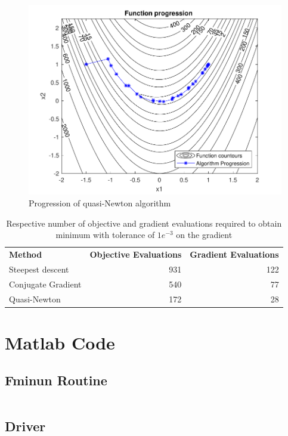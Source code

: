 \documentclass{article}
\newcommand{\wide}{0.7\linewidth}
\begin{document}
\begin{figure}[H]
	\centering
	\includegraphics[width=\wide]{progression3.pdf}
	\caption{Progression of quasi-Newton algorithm}
	\label{fig:steepest3}
\end{figure}

\begin{table}[H]
	\centering
	\caption{Respective number of objective and gradient evaluations required to obtain minimum with tolerance of $1e^{-3}$ on the gradient}
	\label{my-label}
	\begin{tabular}{|l|r|r|}
		\hline
		\textbf{Method}    & \textbf{Objective Evaluations} & \textbf{Gradient Evaluations} \\
		Steepest descent   &                            931 &                           122 \\
		Conjugate Gradient &                            540 &                            77 \\
		Quasi-Newton       &                            172 &                            28 \\ \hline
	\end{tabular}
\end{table}


\section{Matlab Code}

\subsection{Fminun Routine}
\inputminted[xleftmargin=10pt,linenos]{matlab}{fminun.m}
\subsection{Driver}
\inputminted[xleftmargin=10pt,linenos]{matlab}{fminunDriv.m}


\end{document}
